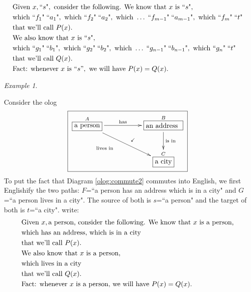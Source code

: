 \documentclass{book}
\def\tn{\textnormal}
\newcommand{\qt}[1]{\tn{``}#1\tn{"}}
\def\rr{\raggedright}
\newcommand{\LA}[2]{\ar[#1]^-{\tn {#2}}}
\newcommand{\LAL}[2]{\ar[#1]_-{\tn {#2}}}
\newcommand{\obox}[3]{\stackrel{#1}{\fbox{\parbox{#2}{#3}}}}
\newcommand{\smbox}[2]{\stackrel{#1}{\fbox{#2}}}
\theoremstyle{remark}
\newtheorem{example}[subsubsection]{Example}
\theoremstyle{definition}
\begin{document}
\begin{align}\label{dia:Englishification}\index{Englishification}
&\tn{Given }x,\qt{s},\tn{ consider the following. We know that }x\tn{ is }\qt{s}, \\
\nonumber&\tn {which } \qt{f_1}\;\qt{a_1}, \tn{ which } \qt{f_2}\;\qt{a_2}, \tn { which }\ldots \; \qt{f_{m-1}}\;\qt{a_{m-1}}, \tn { which } \qt{f_m}\;\qt{t}\\
\nonumber&\tn{that we'll call } P(x).\\
\nonumber&\tn{We also know that }x\tn{ is } \qt{s},\\
\nonumber&\tn {which } \qt{g_1}\;\qt{b_1}, \tn{ which }\qt{g_2}\;\qt{b_2}, \tn { which }\ldots\;\qt{g_{n-1}}\;\qt{b_{n-1}}, \tn { which } \qt{g_n}\;\qt{t}\\
\nonumber&\tn{that we'll call } Q(x).\\
\nonumber&\tn{Fact: whenever }x\tn{ is }``s",\tn{ we will have }P(x)=Q(x).
\end{align}

\begin{example}\label{ex:English fact}

Consider the olog
\begin{align}\label{olog:commute2}\fbox{\xymatrixnocompile{\smbox{A}{a person}\LA{rr}{has}\LAL{drr}{\parbox{.8in}{lives in}}&&\obox{B}{.7in}{\rr an address}\ar@{}[dll]|(.4){\checkmark}\LA{d}{is in}\\&&\smbox{C}{a city}}}
\end{align}
To put the fact that Diagram \ref{olog:commute2} commutes into English, we first Englishify the two paths: $F$=``a person has an address which is in a city" and $G$=``a person lives in a city". The source of both is $s$=``a person" and the target of both is $t$=``a city".
write:
\begin{align*}
&\tn{Given }x,\tn{a person, consider the following. We know that } x\tn{ is a person,}\\
&\tn{which has an address, which is in a city}\\
&\tn{that we'll call } P(x).\\
&\tn{We also know that }x\tn{ is a person,}\\
&\tn{which lives in a city}\\
&\tn{that we'll call } Q(x).\\
&\tn{Fact: whenever }x\tn{ is a person, we will have }P(x)=Q(x).
\end{align*}

\end{example}
\end{document}

